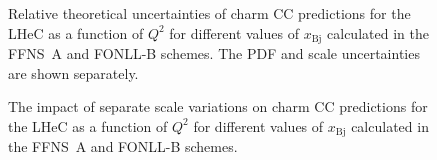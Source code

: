 \documentclass[pdftex,twocolumn,epjc3]{svjour3}          %
\newcommand{\xbj}{\ensuremath{x_{\text{Bj}}}\xspace}
\newcommand{\fonll} {{FONLL-B}\xspace}
\newcommand{\ffns} {{FFNS~A}\xspace}
\begin{document}
\begin{figure}
    \centering
    \caption{Relative theoretical uncertainties of charm CC predictions for the LHeC as a function of $Q^2$ for different values of \xbj calculated in the \ffns and \fonll schemes. The PDF and scale uncertainties are shown separately.}
    \label{fig:thpred-q2-unc}
\end{figure}

\begin{figure}
    \centering
    \caption{The impact of separate scale variations on charm CC predictions for the LHeC as a function of $Q^2$ for different values of \xbj calculated in the \ffns and \fonll schemes.}
    \label{fig:thpred-q2-varmu}
\end{figure}
\end{document}
